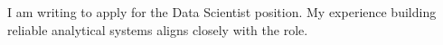 \documentclass{careerdossier-letter}
\begin{document}
\MakeCDossierLetterhead

I am writing to apply for the Data Scientist position. My experience building
reliable analytical systems aligns closely with the role.

\MakeCDossierClosing
\end{document}
